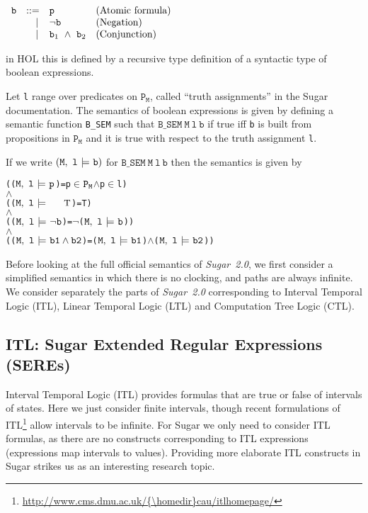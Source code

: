 \documentclass{llncs}
\newcommand{\And}{\(\wedge\)}
\newcommand{\Not}{\(\neg\)}
\newcommand{\In}{\(\in\)}
\newcommand{\T}{\texttt{\small\rm{T}}}
\newcommand{\bTrue}{\T}
\newcommand{\BSem}[3]{(\(\tt#1,~#2~{\models}~#3\))}
\newcommand{\Bsem}{\texttt{B\_SEM}\xspace}
\newcommand{\bSem}[3]{(\tt#1,~#2~{\models}~#3)}
\newcommand{\bProp}[1]{#1}
\newcommand{\bNot}[1]{\neg#1}
\newcommand{\bAnd}[2]{#1\wedge#2}
\newcommand\Sugar{{\it{Sugar~2.0}}\xspace}
\newcommand\Hol{HOL\xspace}
\renewcommand{\t}[1]{\texttt{#1}}
\begin{document}
\medskip

$\begin{array}{ccll}
{\t{b}} & {\rm ::=} & \t{p}
  & \mbox{\rm(Atomic formula)}\\
 & \phantom{\rm ::}\mid & \neg{\t{b}}
  & \mbox{\rm(Negation)}\\
 & \phantom{\rm ::}\mid & {\t{b}}_1~\wedge~{\t{b}}_2
  & \mbox{\rm(Conjunction)}\\
\end{array}$

\medskip

\noindent in \Hol this is defined by a recursive type definition of
a syntactic type of boolean expressions.

Let \t{l} range over predicates on $\t{P}_{\t{M}}$, called ``truth assignments'' in the Sugar
documentation.
The semantics of boolean expressions
is given by defining a semantic function \Bsem such that
$\Bsem~\t{M}~\t{l}~\t{b}$ if true iff \t{b} is built from propositions in $\t{P}_{\t{M}}$ and
it is true with respect to the truth assignment \t{l}.

If we write $\bSem{M}{l}{b}$ for $\Bsem~\t{M}~\t{l}~\t{b}$
then the semantics is given by


{\begin{alltt}
   ({\BSem{M}{l}{\bProp{p}}}     = p {\In} \(\t{P}\sb{\t{M}}\) {\And} p {\In} l)
   {\And}
   ({\BSem{M}{l}{\bTrue}}     = T)
   {\And}
   ({\BSem{M}{l}{{\bNot{b}}}}    = {\Not}{\BSem{M}{l}{b}})
   {\And}
   ({\BSem{M}{l}{\bAnd{b1}{b2}}} = {\BSem{M}{l}{b1}} {\And} {\BSem{M}{l}{b2}})
\end{alltt}}

\medskip



Before looking at the full official semantics of \Sugar, we first
consider a simplified semantics in which there is no clocking, and paths
are always infinite. We consider separately the parts of \Sugar corresponding
to Interval Temporal Logic (ITL), Linear Temporal Logic (LTL) and
Computation Tree Logic (CTL).


\subsection{ITL: Sugar Extended Regular Expressions (SEREs)}\label{SimpleSERE}

Interval Temporal Logic (ITL) provides formulas that are true or false
of intervals of states.  Here we just consider finite intervals,
though recent formulations of ITL\footnote{\url{http://www.cms.dmu.ac.uk/{\homedir}cau/itlhomepage/}} 
allow intervals to be infinite. For
Sugar we only need to consider ITL formulas, as there are no constructs
corresponding to ITL expressions (expressions map intervals to
values). Providing more elaborate ITL constructs in Sugar strikes us as an interesting research topic.
\end{document}
